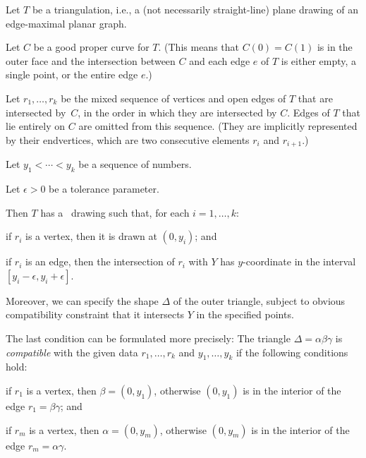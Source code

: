 \begin{thm}

	\begin{compactenum}
        \item Let $T$ be a triangulation,
          i.e.,
          a (not necessarily straight-line)
plane drawing of an edge-maximal planar graph.
		\item Let $C$ be a good proper curve for $T$.
(This means that $C(0)=C(1)$ is in the outer face and the intersection between $C$ and each edge $e$ of $T$ is
either empty, a single point, or the entire edge $e$.)                  
\item Let $r_1,\ldots,r_k$ be the mixed sequence of vertices and open edges
  of $T$ that are intersected by~$C$, in the order in
  which they are intersected by $C$. Edges of $T$ that
  lie entirely on $C$
are omitted from this sequence.
(They are implicitly represented by their endvertices, which are two consecutive elements $r_i$ and $r_{i+1}$.)
		\item Let $y_1<\cdots<y_k$ be a sequence of numbers.
                  
                \item Let $\epsilon>0$ be a tolerance parameter.
\end{compactenum}
Then
        $T$
        has a \Fary\ drawing such that,
        for each $i=1,\ldots,k$: 
	\begin{compactenum}[a)]
		\item if $r_i$ is a vertex, then it is drawn at $(0,y_i)$; and
		\item if $r_i$ is an edge, then the intersection of $r_i$ with $Y$ has $y$-coordinate in the interval $[y_i-\epsilon,y_i+\epsilon]$.
\end{compactenum}

Moreover, we can specify the shape $\Delta$ of the outer triangle,
subject to
obvious compatibility constraint that it intersects $Y$ in the specified points.
                
\end{thm}
The last condition can be formulated more precisely:
The triangle $\Delta=\alpha\beta\gamma$ is \emph{compatible} with the
given data $r_1,\ldots,r_k$ and $y_1,\ldots,y_k$ if the following conditions hold:
\begin{compactenum}
	\item if $r_1$ is a vertex, then $\beta=(0,y_1)$, otherwise $(0, y_1)$ is in the interior of the edge $r_1=\beta\gamma$; and
	\item if $r_m$ is a vertex, then $\alpha=(0,y_m)$, otherwise $(0,y_m)$ is in the interior
	of the edge $r_m=\alpha\gamma$.
\end{compactenum}

